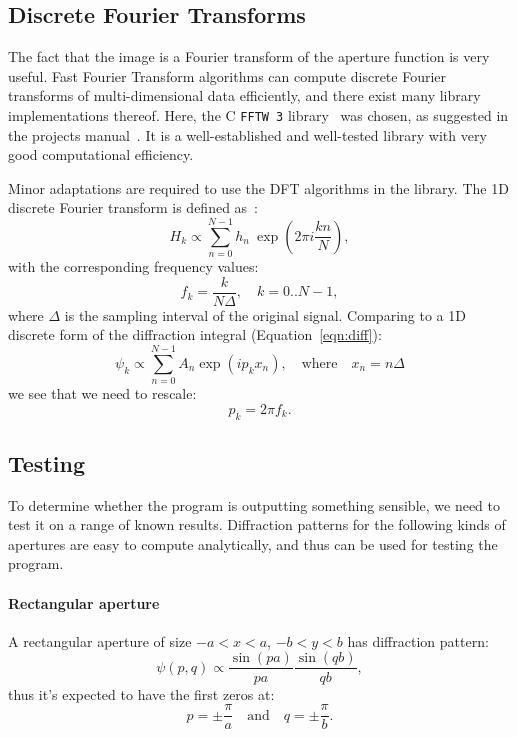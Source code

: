 \documentclass[11pt]{article}
\newcommand{\R}[1]{\mathrm{#1}}
\newcommand{\CC}{{C\nolinebreak[4]\hspace{-.05em}\raisebox{.3ex}{\scriptsize\bf ++}}}
\begin{document}
\subsection{Discrete Fourier Transforms}\label{sec:analysis:dft}
The fact that the image is a Fourier transform of the aperture function is very useful. Fast Fourier Transform algorithms can compute discrete Fourier transforms of multi-dimensional data efficiently, and there exist many library implementations thereof. Here, the \CC{} \texttt{FFTW 3} library~\cite{fftw} was chosen, as suggested in the projects manual~\cite{manual}. It is a well-established and well-tested library with very good computational efficiency.

Minor adaptations are required to use the DFT algorithms in the library. The 1D discrete Fourier transform is defined as~\cite[Chapter 12.1]{NumRecipes}:
\begin{equation}
    H_k \propto \sum_{n=0}^{N-1} h_n\ \exp{\left( 2\pi{}i \frac{kn}{N} \right)},
\end{equation}
with the corresponding frequency values:
\begin{equation}\label{eqn:fk}
    f_k = \frac{k}{N \Delta},\quad k = 0..N-1,
\end{equation}
where $\Delta$ is the sampling interval of the original signal. Comparing to a 1D discrete form of the diffraction integral (Equation~\ref{eqn:diff}):
\begin{equation}
    \psi_k \propto \sum_{n=0}^{N-1} A_n \exp{\left( i p_k x_n \right)},\quad \R{where} \quad x_n = n \Delta
\end{equation}
we see that we need to rescale:
\begin{equation}
    p_k = 2\pi f_k.
\end{equation}

\subsection{Testing}\label{sec:analysis:test}
To determine whether the program is outputting something sensible, we need to test it on a range of known results. Diffraction patterns for the following kinds of apertures are easy to compute analytically, and thus can be used for testing the program.

\paragraph{Rectangular aperture} A rectangular aperture of size $-a < x < a$, $-b < y < b$ has diffraction pattern:
\begin{equation}
    \psi(p, q) \propto \frac{\sin{\left( pa \right)}}{pa} \frac{\sin{\left( qb \right)}}{qb},
\end{equation}
thus it's expected to have the first zeros at:
\begin{equation}\label{eqn:test_rect}
    p = \pm \frac{\pi}{a}\quad \R{and} \quad q = \pm \frac{\pi}{b}.
\end{equation}
\end{document}
